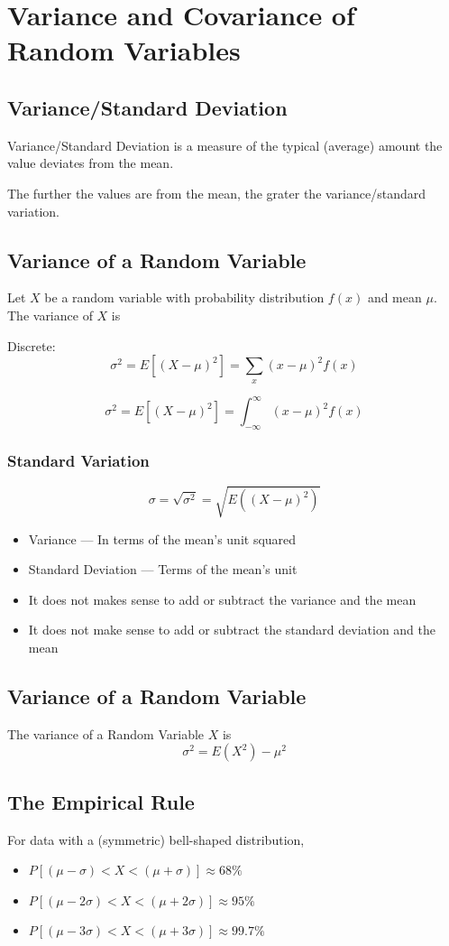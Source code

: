 \documentclass{book}
\begin{document}
\section{Variance and Covariance of Random Variables}

\subsection{Variance/Standard Deviation}

Variance/Standard Deviation is a measure of the typical (average) amount the value deviates from the mean.

The further the values are from the mean, the grater the variance/standard variation. 

\subsection{Variance of a Random Variable}
Let $X$ be a random variable with probability distribution $f(x)$ and mean $\mu$. The variance of $X$ is 

Discrete:
$$\sigma^2=E[(X-\mu)^2]=\sum_x(x-\mu)^2 f(x)$$

$$\sigma^2=E[(X-\mu)^2]=\int_{-\infty}^\infty (x-\mu)^2 f(x)$$

\subsubsection{Standard Variation}

$$\sigma = \sqrt{\sigma^2} = \sqrt{E((X-\mu)^2)}$$

\begin{itemize}
\item Variance --- In terms of the mean's unit squared
\item Standard Deviation --- Terms of the mean's unit
\item It does not makes sense to add or subtract the variance and the mean
\item It does not make sense to add or subtract the standard deviation and the mean
\end{itemize}

\subsection{Variance of a Random Variable}
The variance of a Random Variable $X$ is
$$\sigma^2 = E(X^2)-\mu^2$$

\subsection{The Empirical Rule}
For data with a (symmetric) bell-shaped distribution,
\begin{itemize}
\item $P[(\mu -\sigma) < X < (\mu + \sigma)] \approx 68\%$
\item $P[(\mu -2\sigma) < X < (\mu + 2\sigma)] \approx 95\%$
\item $P[(\mu -3\sigma) < X < (\mu + 3\sigma)] \approx 99.7\%$
\end{itemize}
\end{document}
